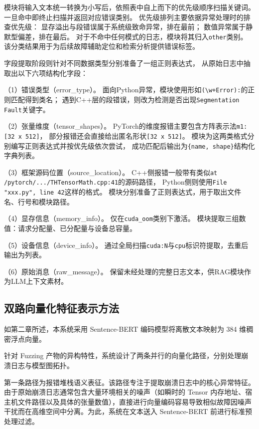 模块将输入文本统一转换为小写后，依照表中自上而下的优先级顺序扫描关键词。
一旦命中即终止扫描并返回对应错误类别。
优先级排列主要依据异常处理时的排查优先级：
显存溢出与段错误属于系统级致命异常，排在最前；
数值异常属于静默型偏差，排在最后。
对于不命中任何模式的日志，模块将其归入\texttt{other}类别。
该分类结果用于为后续故障辅助定位和检索分析提供错误标签。

字段提取阶段则针对不同数据类型分别准备了一组正则表达式，
从原始日志中抽取出以下六项结构化字段：

（1）错误类型（error\_type）。
面向Python异常，模块使用形如\texttt{(\textbackslash w+Error):}的正则匹配得到类名；
遇到C++层的段错误，则改为检测是否出现\texttt{Segmentation Fault}关键字。

（2）张量维度（tensor\_shapes）。
PyTorch的维度报错主要包含方阵表示法\texttt{m1: [32 x 512]}，
部分报错还会直接给出匿名形状\texttt{[32 x 512]}。
模块为这两类格式分别编写正则表达式并按优先级依次尝试，
成功匹配后输出为\texttt{\{name, shape\}}结构化字典列表。

（3）框架源码位置（source\_location）。
C++侧报错一般带有类似\texttt{at /pytorch/.../}\allowbreak\texttt{THTensorMath.cpp:41}的源码路径，
Python侧则使用\texttt{File "xxx.py", line 42}这样的格式。
模块分别准备了正则表达式，用于取出文件名、行号和模块路径。

（4）显存信息（memory\_info）。
仅在\texttt{cuda\_oom}类别下激活。
模块提取三组数值：请求分配量、已分配量与设备总容量。

（5）设备信息（device\_info）。
通过全局扫描\texttt{cuda:N}与\texttt{cpu}标识符提取，去重后输出为列表。

（6）原始消息（raw\_message）。
保留未经处理的完整日志文本，供RAG模块作为LLM上下文素材。

\subsection{双路向量化特征表示方法}



如第二章所述，本系统采用 Sentence-BERT 编码模型将离散文本映射为 384 维稠密浮点向量。

针对 Fuzzing 产物的异构特性，系统设计了两条并行的向量化路径，分别处理崩溃日志与模型图拓扑。







第一条路径为报错堆栈语义表征。该路径专注于提取崩溃日志中的核心异常特征。由于原始崩溃日志通常包含大量环境相关的噪声（如瞬时的 Tensor 内存地址、宿主机文件路径以及具体的张量数值），直接进行向量编码容易导致相似故障因噪声干扰而在高维空间中分离。为此，系统在文本送入 Sentence-BERT 前进行标准预处理过滤。



